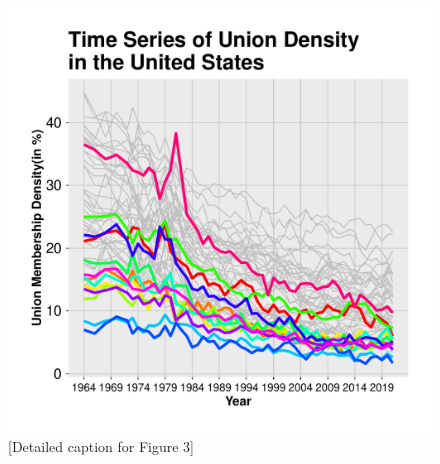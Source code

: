 \documentclass[11pt]{article}\usepackage[]{graphicx}\usepackage[]{xcolor}
\newenvironment{knitrout}{}{} %
\begin{document}
\begin{figure}[h]
\centering
\begin{minipage}{0.9\linewidth}
\begin{knitrout}
\color{fgcolor}

{\centering \includegraphics[width=.8\linewidth]{figure/TimesSeriesUnitedStatesSouth-1} 

}


\end{knitrout}

  \caption{[Detailed caption for Figure 3]}
  \label{fig:4}
  \end{minipage}
\end{figure}
\end{document}
